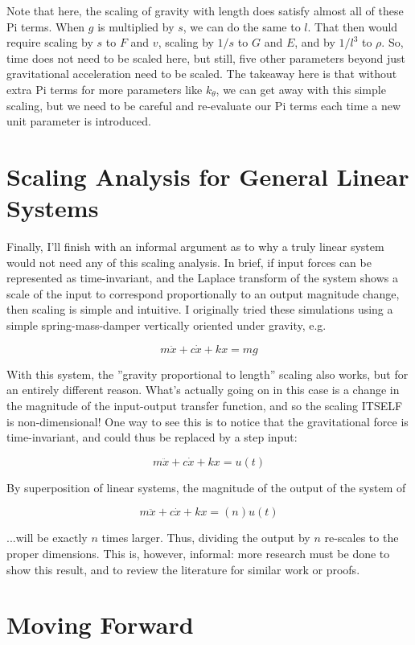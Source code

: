 \documentclass[12pt,letterpaper]{article}
\begin{document}
Note that here, the scaling of gravity with length does satisfy almost all of these Pi terms.
When $g$ is multiplied by $s$, we can do the same to $l$.
That then would require scaling by $s$ to $F$ and $v$, scaling by $1/s$ to $G$ and $E$, and by $1/l^3$ to $\rho$.
So, time does not need to be scaled here, but still, five other parameters beyond just gravitational acceleration need to be scaled.
The takeaway here is that without extra Pi terms for more parameters like $k_{\theta}$, we can get away with this simple scaling, but we need to be careful and re-evaluate our Pi terms each time a new unit parameter is introduced.

\section{Scaling Analysis for General Linear Systems}

Finally, I'll finish with an informal argument as to why a truly linear system would not need any of this scaling analysis.
In brief, if input forces can be represented as time-invariant, and the Laplace transform of the system shows a scale of the input to correspond proportionally to an output magnitude change, then scaling is simple and intuitive.
I originally tried these simulations using a simple spring-mass-damper vertically oriented under gravity, e.g.

\[
m \ddot x + c \dot x + k x = mg
\]

With this system, the ''gravity proportional to length'' scaling also works, but for an entirely different reason.
What's actually going on in this case is a change in the magnitude of the input-output transfer function, and so the scaling ITSELF is non-dimensional!
One way to see this is to notice that the gravitational force is time-invariant, and could thus be replaced by a step input:

\[
m \ddot x + c \dot x + k x = u(t)
\]

By superposition of linear systems, the magnitude of the output of the system of

\[
m \ddot x + c \dot x + k x = (n) u(t)
\]

...will be exactly $n$ times larger. Thus, dividing the output by $n$ re-scales to the proper dimensions.
This is, however, informal: more research must be done to show this result, and to review the literature for similar work or proofs.

\section{Moving Forward}
\end{document}
